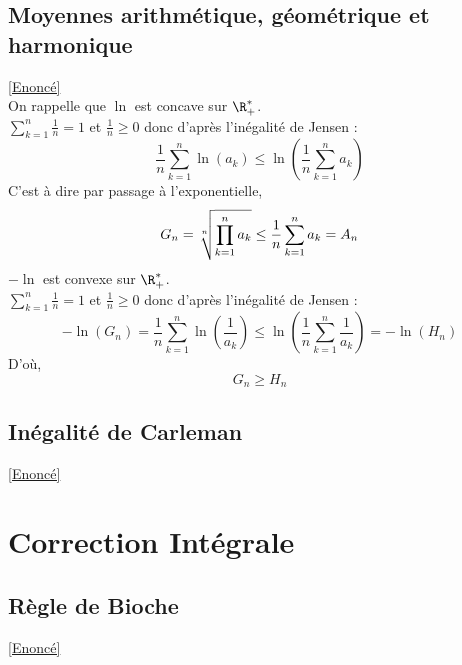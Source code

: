 \documentclass{book}
\begin{document}
	\subsection{Moyennes arithmétique, géométrique et harmonique }\label{sec:moyennes-arithmetique-geometrique-et-harmonique-etoile1}
	\textcolor{blue}{\hyperref[Moyennes arithémtique, géométrique et harmonique]{[Enoncé]}}\\
	On rappelle que $\ln$ est concave sur $\R^*_+$.\\
	$\displaystyle\sum\limits_{k=1}^n\frac{1}{n}=1$ et $\displaystyle\frac{1}{n}\geq 0$ donc d'après l'inégalité de Jensen :
	$$\displaystyle\frac{1}{n}\sum\limits_{k=1}^n\ln(a_k)\leq \ln\left(\displaystyle\frac{1}{n}\sum\limits_{k=1}^n a_k\right)$$
	C'est à dire par passage à l'exponentielle,
	$$G_n=\displaystyle\displaystyle\sqrt[n]{\prod\limits_{k=1}^n a_k}\leq \displaystyle\frac{1}{n}\sum\limits_{k=1}^n a_k=A_n$$
	$-\ln$ est convexe sur $\R^*_+$.\\
	$\displaystyle\sum\limits_{k=1}^n\frac{1}{n}=1$ et $\displaystyle\frac{1}{n}\geq 0$ donc d'après l'inégalité de Jensen :
	$$-\ln(G_n)=\displaystyle\frac{1}{n}\sum\limits_{k=1}^n\ln\left(\frac{1}{a_k}\right)\leq \ln\left(\displaystyle\frac{1}{n}\sum\limits_{k=1}^n\frac{1}{a_k}\right)=-\ln(H_n)$$
	D'où,
	$$G_n\geq H_n$$
	
	\subsection{Inégalité de Carleman}
	\label{sec:inegalite-de-carleman}
	\textcolor{blue}{\hyperref[Inégalité de Carleman]{[Enoncé]}}\\
	
	\newpage
\section{Correction Intégrale}
	\subsection{Règle de Bioche}
	\label{Règle de Bioche corrigé}
	\textcolor{blue}{\hyperref[bioche]{[Enoncé]}}\\
		
\end{document}
